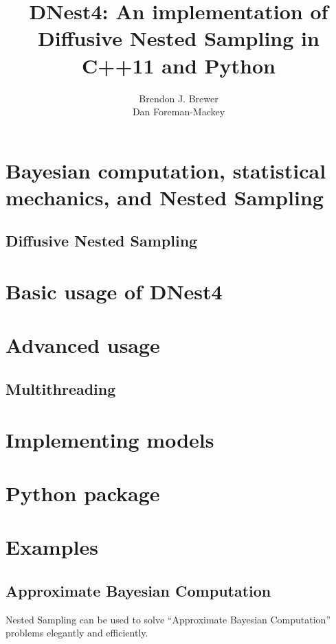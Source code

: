 \documentclass[a4paper, 12pt]{article}
\title{DNest4: An implementation of Diffusive Nested Sampling
in C++11 and Python}
\author{Brendon J. Brewer\\
Dan Foreman-Mackey}
\date{}
\begin{document}
\maketitle


\setlength{\parindent}{0pt}
\setlength{\parskip}{8pt}

\section{Bayesian computation, statistical mechanics, and Nested Sampling}


\subsection{Diffusive Nested Sampling}



\section{Basic usage of DNest4}

\section{Advanced usage}

\subsection{Multithreading}

\section{Implementing models}

\section{Python package}


\section{Examples}

\subsection{}

\subsection{Approximate Bayesian Computation}
Nested Sampling can be used to solve ``Approximate Bayesian Computation''
problems elegantly and efficiently.


\begin{thebibliography}{999}
\end{thebibliography}
\end{document}
